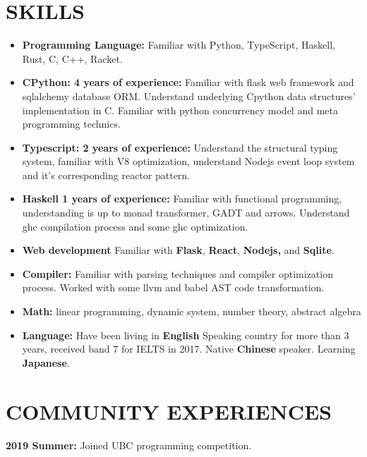 \documentclass{res}
\begin{document}
\begin{resume}
\section{SKILLS}
    \begin{itemize}[leftmargin=-.2in]
        \setlength\itemsep{-1em}
        \item \textbf{Programming Language:} Familiar with Python, TypeScript, Haskell, Rust, C, C++, Racket.\\
        \item \textbf{CPython: 4 years of experience:} Familiar with flask web framework and sqlalchemy database ORM. Understand underlying Cpython data structures' implementation in C. Familiar with python concurrency model and meta programming technics. \\
        \item \textbf{Typescript: 2 years of experience:} Understand the structural typing system, familiar with V8 optimization, understand Nodejs event loop system and it's corresponding reactor pattern. \\
        \item \textbf{Haskell 1 years of experience:} Familiar with functional programming, understanding is up to monad transformer, GADT and arrows. Understand ghc compilation process and some ghc optimization. \\
        \item \textbf{Web development} Familiar with \textbf{Flask}, \textbf{React},\textbf{ Nodejs,} and \textbf{Sqlite}. \\
        \item \textbf{Compiler:} Familiar with parsing techniques and compiler optimization process. Worked with some llvm and babel AST code transformation. \\
        \item \textbf{Math:} linear programming, dynamic system, number theory, abstract algebra \\
        \item \textbf{Language:} Have been living in \textbf{English} Speaking country for more than 3 years, received band 7 for IELTS in 2017. Native \textbf{Chinese} speaker. Learning \textbf{Japanese}.
    \end{itemize}

\section{COMMUNITY EXPERIENCES}
    \textbf {2019 Summer:} Joined UBC programming competition.
\end{resume}
\end{document}
